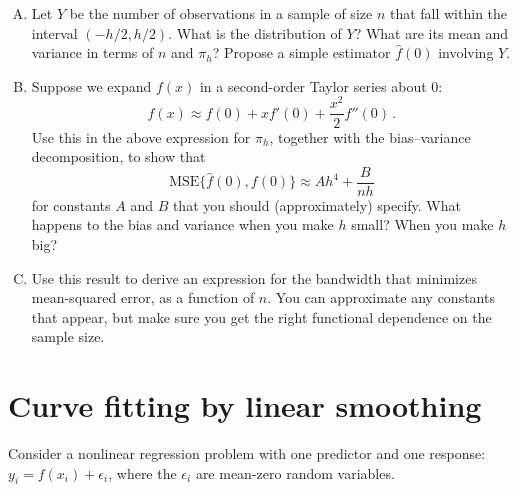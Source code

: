 \documentclass{mynotes}
\newcommand{\MSE}{\mbox{MSE}}
\newtheorem{theorem}{Theorem}
\begin{document}
\begin{enumerate}[(A)]
\item Let $Y$ be the number of observations in a sample of size $n$ that fall within the interval $(-h/2, h/2)$.  What is the distribution of $Y$?  What are its mean and variance in terms of $n$ and $\pi_h$?  Propose a simple estimator $\hat{f}(0)$ involving $Y$.
\item Suppose we expand $f(x)$ in a second-order Taylor series about $0$:
$$
f(x) \approx f(0) + x f'(0) + \frac{x^2}{2} f''(0) \, .
$$
Use this in the above expression for $\pi_h$, together with the bias--variance decomposition, to show that
$$
\MSE\{ \hat{f}(0), f(0) \} \approx A h^4 + \frac{B}{nh}
$$
for constants $A$ and $B$ that you should (approximately) specify.  What happens to the bias and variance when you make $h$ small?  When you make $h$ big?

\item Use this result to derive an expression for the bandwidth that minimizes mean-squared error, as a function of $n$.  You can approximate any constants that appear, but make sure you get the right functional dependence on the sample size.

\end{enumerate}


%


\section{Curve fitting by linear smoothing}

Consider a nonlinear regression problem with one predictor and one response: $y_i = f(x_i) + \epsilon_i$, where the $\epsilon_i$ are mean-zero random variables.
\end{document}
